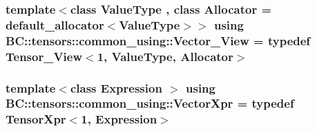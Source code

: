 \subsubsection[{\texorpdfstring{Vector\+\_\+\+View}{Vector_View}}]{\setlength{\rightskip}{0pt plus 5cm}template$<$class Value\+Type , class Allocator  = default\+\_\+allocator$<$\+Value\+Type$>$$>$ using {\bf B\+C\+::tensors\+::common\+\_\+using\+::\+Vector\+\_\+\+View} = typedef {\bf Tensor\+\_\+\+View}$<$1, Value\+Type, {\bf Allocator}$>$}\hypertarget{namespaceBC_1_1tensors_1_1common__using_a80a9a6820d00557792384dac33934fba}{}\label{namespaceBC_1_1tensors_1_1common__using_a80a9a6820d00557792384dac33934fba}
\subsubsection[{\texorpdfstring{Vector\+Xpr}{VectorXpr}}]{\setlength{\rightskip}{0pt plus 5cm}template$<$class Expression $>$ using {\bf B\+C\+::tensors\+::common\+\_\+using\+::\+Vector\+Xpr} = typedef {\bf Tensor\+Xpr}$<$1, Expression$>$}\hypertarget{namespaceBC_1_1tensors_1_1common__using_ab568becd4b1421e4a6d7d34ebb8cdae9}{}\label{namespaceBC_1_1tensors_1_1common__using_ab568becd4b1421e4a6d7d34ebb8cdae9}
